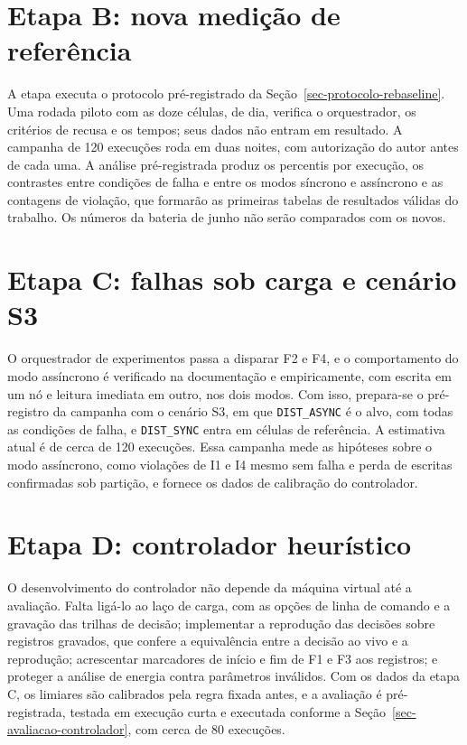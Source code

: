 \section*{Etapa B: nova medição de referência}
\label{ap-tcc2-etapa-b}

A etapa executa o protocolo pré-registrado da Seção~\ref{sec-protocolo-rebaseline}. Uma rodada piloto com as doze células, de dia, verifica o orquestrador, os critérios de recusa e os tempos; seus dados não entram em resultado. A campanha de 120 execuções roda em duas noites, com autorização do autor antes de cada uma. A análise pré-registrada produz os percentis por execução, os contrastes entre condições de falha e entre os modos síncrono e assíncrono e as contagens de violação, que formarão as primeiras tabelas de resultados válidas do trabalho. Os números da bateria de junho não serão comparados com os novos.

\section*{Etapa C: falhas sob carga e cenário S3}
\label{ap-tcc2-etapa-c}

O orquestrador de experimentos passa a disparar F2 e F4, e o comportamento do modo assíncrono é verificado na documentação e empiricamente, com escrita em um nó e leitura imediata em outro, nos dois modos. Com isso, prepara-se o pré-registro da campanha com o cenário S3, em que \texttt{DIST\_ASYNC} é o alvo, com todas as condições de falha, e \texttt{DIST\_SYNC} entra em células de referência. A estimativa atual é de cerca de 120 execuções. Essa campanha mede as hipóteses sobre o modo assíncrono, como violações de I1 e I4 mesmo sem falha e perda de escritas confirmadas sob partição, e fornece os dados de calibração do controlador.

\section*{Etapa D: controlador heurístico}
\label{ap-tcc2-etapa-d}

O desenvolvimento do controlador não depende da máquina virtual até a avaliação. Falta ligá-lo ao laço de carga, com as opções de linha de comando e a gravação das trilhas de decisão; implementar a reprodução das decisões sobre registros gravados, que confere a equivalência entre a decisão ao vivo e a reprodução; acrescentar marcadores de início e fim de F1 e F3 aos registros; e proteger a análise de energia contra parâmetros inválidos. Com os dados da etapa C, os limiares são calibrados pela regra fixada antes, e a avaliação é pré-registrada, testada em execução curta e executada conforme a Seção~\ref{sec-avaliacao-controlador}, com cerca de 80 execuções.

